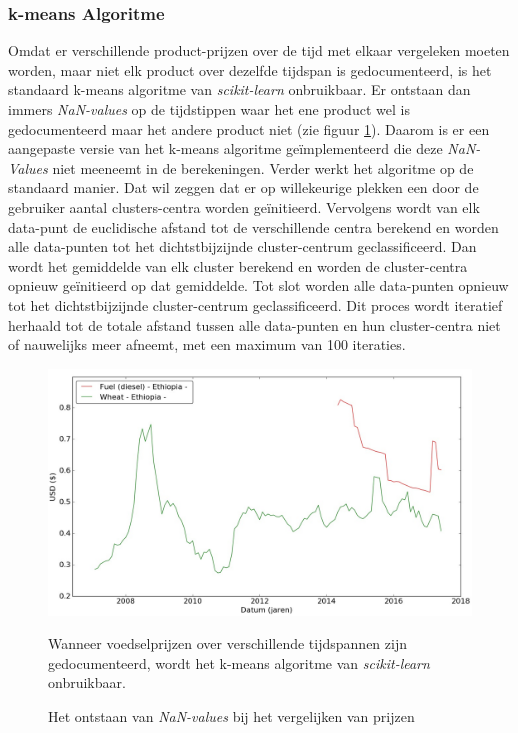 \documentclass{article}
\begin{document}
\subsubsection*{k-means Algoritme}
Omdat er verschillende product-prijzen over de tijd met elkaar vergeleken moeten worden, maar niet elk product over dezelfde tijdspan is gedocumenteerd, is het standaard k-means algoritme van \textit{scikit-learn} onbruikbaar. Er ontstaan dan immers \textit{NaN-values} op de tijdstippen waar het ene product wel is gedocumenteerd maar het andere product niet (zie figuur \ref{fig_Nans}). Daarom is er een aangepaste versie van het k-means algoritme geïmplementeerd die deze \textit{NaN-Values} niet meeneemt in de berekeningen. Verder werkt het algoritme op de standaard manier. Dat wil zeggen dat er op willekeurige plekken een door de gebruiker aantal clusters-centra worden geïnitieerd. Vervolgens wordt van elk data-punt de euclidische afstand tot de verschillende centra berekend en worden alle data-punten tot het dichtstbijzijnde cluster-centrum geclassificeerd. Dan wordt het gemiddelde van elk cluster berekend en worden de cluster-centra opnieuw geïnitieerd op dat gemiddelde. Tot slot worden alle data-punten opnieuw tot het dichtstbijzijnde cluster-centrum geclassificeerd. Dit proces wordt iteratief herhaald tot de totale afstand tussen alle data-punten en hun cluster-centra niet of nauwelijks meer afneemt, met een maximum van 100 iteraties. \\

\begin{figure}[h!]
\centering
\includegraphics[scale=0.25]{EDA_K_means}
\caption{Het ontstaan van \textit{NaN-values} bij het vergelijken van prijzen }
\label{fig_Nans}
\medskip
\small
Wanneer voedselprijzen over verschillende tijdspannen zijn gedocumenteerd, wordt het k-means algoritme van \textit{scikit-learn} onbruikbaar. \end{figure}
\end{document}
